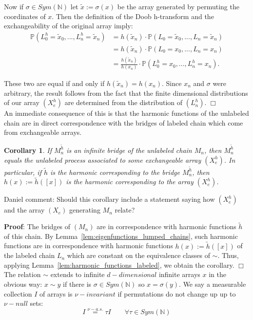 \documentclass[11pt,oneside,reqno]{article}
\theoremstyle{plain}
\newtheorem{corollary}[theorem]{Corollary}
\theoremstyle{definition}
\numberwithin{equation}{section}
\newcommand{\N}{\mathbb{N}}
\renewcommand{\P}{\mathbb{P}}
\newcommand{\tx}{\tilde{x}}
\newcommand{\daniel}[1]{\textcolor{Emerald}{Daniel comment: #1}}
\begin{document}
Now if $\sigma \in Sym(\N)$ let $\tx := \sigma(x)$ be the array generated by permuting the coordinates of $x$. Then the definition of the Doob h-transform and the exchangeability of the original array imply:
%
\begin{align*}
    \P(L^h_0 = \tx_0, ..., L^h_n = \tx_n)  & = h(\tx_n) \cdot \P(L_0 = \tx_0, ..., L_n = \tx_n) \\
    & = h(\tx_n) \cdot \P(L_0 = x_0, ..., L_n = x_n) \\
    & = \frac{h(\tx_n)}{h(x_n)} \cdot \P(L^h_0 = x_0, ..., L^h_n = x_n). 
\end{align*}

\noindent These two are equal if and only if $h(\tx_n) = h(x_n)$. Since $x_n$ and $\sigma$ were arbitrary, the result follows from the fact that the finite dimensional distributions of our array $(X^h_e)$ are determined from the distribution of $(L_n^h)$. $\Box$\\

An immediate consequence of this is that the harmonic functions of the unlabeled chain are in direct correspondence with the bridges of labeled chain which come from exchangeable arrays.

\begin{corollary}
    If $M^{\tilde{h}}_n$ is an infinite bridge of the unlabeled chain $M_n$, then $M^{\tilde{h}}_n$ equals the unlabeled process associated to some exchangeable array $(X_e^h)$. In particular, if $\tilde{h}$ is the harmonic corresponding to the bridge $M^{\tilde{h}}_n$, then $h(x) := \tilde{h}([x])$ is the harmonic corresponding to the array $(X_e^h)$.

    \label{cor:unlabeled_associated_to_exchangeable_array}
\end{corollary}

\daniel{Should this corollary include a statement saying how $(X_e^h)$ and the array $(X_e)$ generating $M_n$ relate?}

\noindent \textbf{Proof}: The bridges of $(M_n)$ are in correspondence with harmonic functions $\tilde{h}$ of this chain. By Lemma~\ref{lem:eigenfunctions_lumped_chains}, such harmonic functions are in correspondence with harmonic functions $h(x) := \tilde{h}([x])$ of the labeled chain $L_n$ which are constant on the equivalence classes of $\sim$. Thus, applying Lemma~\ref{lem:harmonic_functions_labeled}, we obtain the corollary. $\Box$ \\

The relation $\sim$ extends to infinite $d-dimensional$ infinite arrays $x$ in the obvious way: $x \sim y$ if there is $\sigma \in Sym(\N)$ so $x = \sigma(y)$. We say a measurable collection $I$ of arrays is \textit{$\nu-invariant$} if permutations do not change up up to $\nu-null$ sets:
\[ I \overset{\nu-a.s.}{=} \tau I \quad  \quad \forall \tau \in Sym(\N)\]
\end{document}

